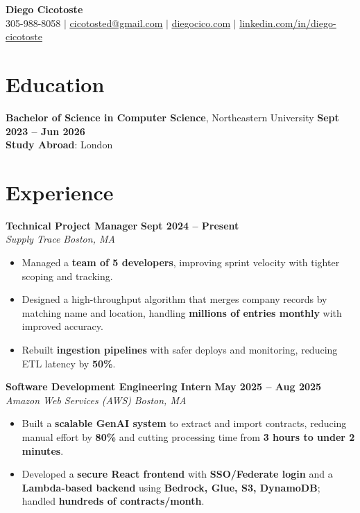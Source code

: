 \documentclass[8pt]{resume}
\begin{document}
\begin{center}
    \textbf{\Huge Diego Cicotoste} \\[1pt]
    \small
    305-988-8058 $|$
    \href{mailto:cicotosted@gmail.com}{\underline{cicotosted@gmail.com}} $|$
    \href{https://www.diegocico.com}{\underline{diegocico.com}} $|$
    \href{https://linkedin.com/in/diego-cicotoste}{\underline{linkedin.com/in/diego-cicotoste}}
\end{center}

\section{Education}
\textbf{Bachelor of Science in Computer Science}, Northeastern University
\hfill \textbf{Sept 2023 – Jun 2026}\\
\textbf{Study Abroad}: London

\section{Experience}

\textbf{Technical Project Manager} \hfill \textbf{Sept 2024 – Present}\\
\textit{Supply Trace} \hfill \textit{Boston, MA}
\begin{itemize}
    \item Managed a \textbf{team of 5 developers}, improving sprint velocity with tighter scoping and tracking.
    \item Designed a high-throughput algorithm that merges company records by matching name and location, handling \textbf{millions of entries monthly} with improved accuracy.
    \item Rebuilt \textbf{ingestion pipelines} with safer deploys and monitoring, reducing ETL latency by \textbf{50\%}.
\end{itemize}

\textbf{Software Development Engineering Intern} \hfill \textbf{May 2025 – Aug 2025}\\
\textit{Amazon Web Services (AWS)} \hfill \textit{Boston, MA}
\begin{itemize}
    \item Built a \textbf{scalable GenAI system} to extract and import contracts, reducing manual effort by \textbf{80\%} and cutting processing time from \textbf{3 hours to under 2 minutes}.
    \item Developed a \textbf{secure React frontend} with \textbf{SSO/Federate login} and a \textbf{Lambda-based backend} using \textbf{Bedrock, Glue, S3, DynamoDB}; handled \textbf{hundreds of contracts/month}.
\end{itemize}
\end{document}
